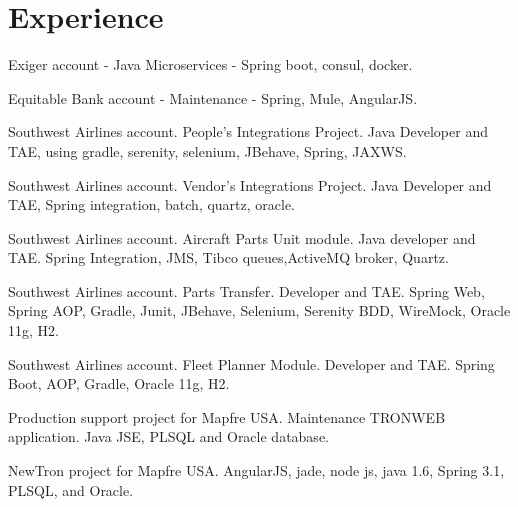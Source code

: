 \documentclass[]{deedy-resume-openfont}
\begin{document}
\begin{minipage}[t]{0.66\textwidth} 


\section{Experience}

\vspace{\topsep} %
\begin{tightemize}
\item Exiger account - Java Microservices - Spring boot, consul, docker.
\item Equitable Bank account - Maintenance - Spring, Mule, AngularJS.
\end{tightemize}
\sectionsep

\begin{tightemize}
\item Southwest Airlines account. People's Integrations Project. Java Developer and TAE, using gradle, serenity, selenium, JBehave, Spring, JAXWS. 
\item Southwest Airlines account. Vendor's Integrations Project. Java Developer and TAE, Spring integration, batch, quartz, oracle.  
\item Southwest Airlines account. Aircraft Parts Unit module. Java developer and TAE. Spring Integration, JMS, Tibco queues,ActiveMQ broker, Quartz.
\item Southwest Airlines account. Parts Transfer. Developer and TAE. Spring Web, Spring AOP, Gradle, Junit, JBehave, Selenium, Serenity BDD, WireMock, Oracle 11g, H2.
\item Southwest Airlines account. Fleet Planner Module. Developer and TAE. Spring Boot, AOP, Gradle, Oracle 11g, H2.\end{tightemize}
\sectionsep

\begin{tightemize}
\item Production support project for Mapfre USA. Maintenance TRONWEB application. Java JSE, PLSQL and Oracle database.
\item NewTron project for Mapfre USA. AngularJS, jade, node js, java 1.6, Spring 3.1, PLSQL, and Oracle.
\end{tightemize}
\sectionsep


\end{minipage}
\end{document}
